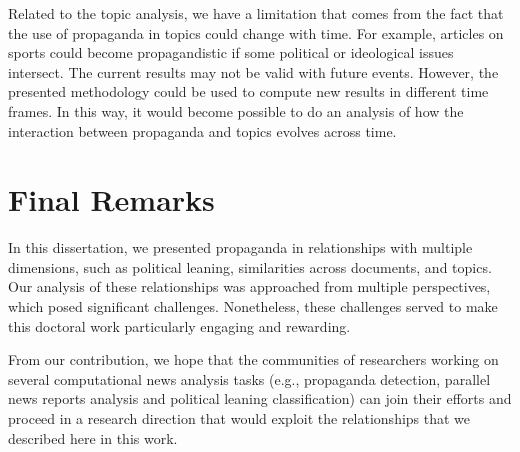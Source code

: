 Related to the topic analysis, we have a limitation that comes from the fact that the use of propaganda in topics could change with time. %
For example, articles on sports could become propagandistic if some political or ideological issues intersect. %
The current results may not be valid with future events.
However, the presented methodology could be used to compute new results in different time frames.
In this way, it would become possible to do an analysis of how the interaction between propaganda and topics evolves across time.



\section{\statusgreen Final Remarks}
\label{sec:discussion_conclusions}

In this dissertation, we presented propaganda in relationships with multiple dimensions, such as political leaning, similarities across documents, and topics. Our analysis of these relationships was approached from multiple perspectives, which posed significant challenges. Nonetheless, these challenges served to make this doctoral work particularly engaging and rewarding.

From our contribution, we hope that the communities of researchers working on several computational news analysis tasks (e.g., propaganda detection, parallel news reports analysis and political leaning classification) can join their efforts and proceed in a research direction that would exploit the relationships that we described here in this work.
